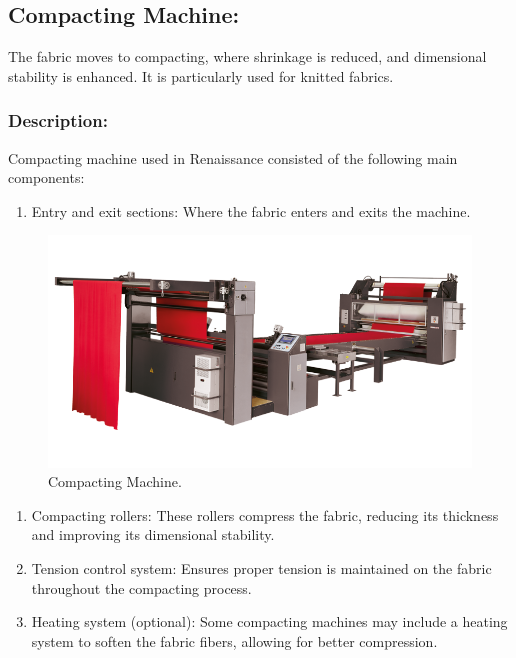 \subsection{Compacting Machine:}

The fabric moves to compacting, where shrinkage is reduced, and dimensional stability is enhanced.
It is particularly used for knitted fabrics.


\subsubsection{Description:}


Compacting machine used in Renaissance consisted of the following main
components:


\begin{enumerate}
\item
  Entry and exit sections: Where the fabric enters and exits the
  machine.
\end{enumerate}




\begin{figure}[h!]
  \centering
  \includegraphics[width=0.8\linewidth]{figs/production/image4.png}
  \caption{Compacting Machine.}
  \label{fig:Compacting Machine.}
\end{figure}


\begin{enumerate}
\item
  Compacting rollers: These rollers compress the fabric, reducing its
  thickness and improving its dimensional stability.
\item
  Tension control system: Ensures proper tension is maintained on the
  fabric throughout the compacting process.
\item
  Heating system (optional): Some compacting machines may include a
  heating system to soften the fabric fibers, allowing for better
  compression.
\end{enumerate}

